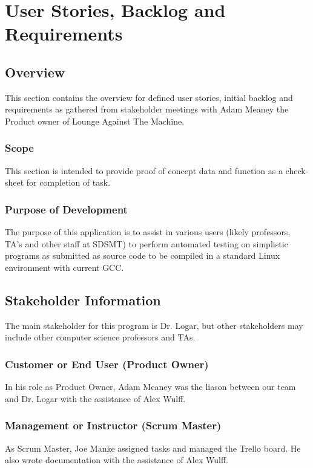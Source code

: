 \chapter{User Stories, Backlog and Requirements}
\section{Overview}
This section contains the overview for defined user stories, initial backlog and requirements as gathered from stakeholder meetings with Adam Meaney the Product owner of Lounge Against The Machine.

\subsection {Scope}
This section is intended to provide proof of concept data and function as a check-sheet for completion of task.

\subsection {Purpose of Development}
The purpose of this application is to assist in various users (likely professors, TA's and other staff at SDSMT) to perform automated testing on simplistic programs as submitted as source code to be compiled in a standard Linux environment with current GCC.

\section{ Stakeholder Information}

The main stakeholder for this program is Dr. Logar, but other stakeholders may include other computer science professors and TAs.

\subsection{Customer or End User (Product Owner)}
In his role as Product Owner, Adam Meaney was the liason between our team and Dr. Logar with the assistance of Alex Wulff.

\subsection{Management or Instructor (Scrum Master)}
As Scrum Master, Joe Manke assigned tasks and managed the Trello board. He also wrote documentation with the assistance of Alex Wulff.

